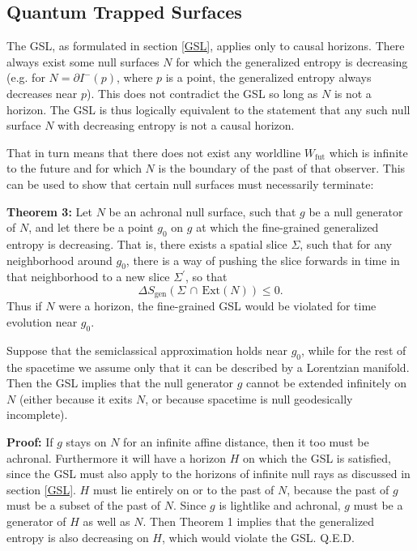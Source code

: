 \documentclass[12pt]{article}
\begin{document}
\subsection{Quantum Trapped Surfaces}

The GSL, as formulated in section \ref{GSL}, applies only to causal horizons.  There always exist some null surfaces $N$ for which the generalized entropy is decreasing (e.g. for $N = \partial I^-(p)$, where $p$ is a point, the generalized entropy always decreases near $p$).  This does not contradict the GSL so long as $N$ is not a horizon.  The GSL is thus logically equivalent to the statement that any such null surface $N$ with decreasing entropy is not a causal horizon. 

That in turn means that there does not exist any worldline $W_\mathrm{fut}$ which is infinite to the future and for which $N$ is the boundary of the past of that observer.  This can be used to show that certain null surfaces must necessarily terminate:

\textbf{Theorem 3:}  Let $N$ be an achronal null surface, such that $g$ be a null generator of $N$, and let there be a point $g_0$ on $g$ at which the fine-grained generalized entropy is decreasing.  That is, there exists a spatial slice $\Sigma$, such that for any neighborhood around $g_0$, there is a way of pushing the slice forwards in time in that neighborhood to a new slice $\Sigma^\prime$, so that
\begin{equation}
\Delta S_\mathrm{gen}(\Sigma\,\cap\,\mathrm{Ext}(N)) \le 0.
\end{equation}
Thus if $N$ were a horizon, the fine-grained GSL would be violated for time evolution near $g_0$.

Suppose that the semiclassical approximation holds near $g_0$, while for the rest of the spacetime we assume only that it can be described by a Lorentzian manifold.  Then the GSL implies that the null generator $g$ cannot be extended infinitely on $N$ (either because it exits $N$, or because spacetime is null geodesically incomplete).

\textbf{Proof:} If $g$ stays on $N$ for an infinite affine distance, then it too must be achronal.  Furthermore it will have a horizon $H$ on which the GSL is satisfied, since the GSL must also apply to the horizons of infinite null rays as discussed in section \ref{GSL}.  $H$ must lie entirely on or to the past of $N$, because the past of $g$ must be a subset of the past of $N$.  Since $g$ is lightlike and achronal, $g$ must be a generator of $H$ as well as $N$.  Then Theorem 1 implies that the generalized entropy is also decreasing on $H$, which would violate the GSL.  Q.E.D.
\end{document}
